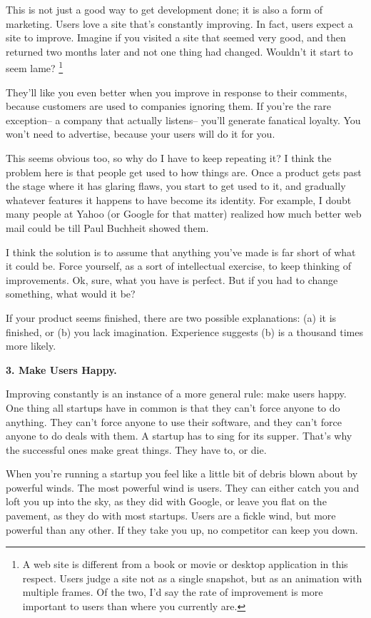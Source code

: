 \documentclass[12pt]{book}
\begin{document}
This is not just a good way to get development done; it is also a form
of marketing. Users love a site that's constantly improving. In fact,
users expect a site to improve. Imagine if you visited a site that
seemed very good, and then returned two months later and not one thing
had changed. Wouldn't it start to seem lame? \footnote{A web site is different from a book or movie or desktop
application in this respect. Users judge a site not as a single
snapshot, but as an animation with multiple frames. Of the two, I'd say
the rate of improvement is more important to users than where you
currently are.}

They'll like you even better when you improve in response to their
comments, because customers are used to companies ignoring them. If
you're the rare exception-- a company that actually listens-- you'll
generate fanatical loyalty. You won't need to advertise, because your
users will do it for you.

This seems obvious too, so why do I have to keep repeating it? I think
the problem here is that people get used to how things are. Once a
product gets past the stage where it has glaring flaws, you start to get
used to it, and gradually whatever features it happens to have become
its identity. For example, I doubt many people at Yahoo (or Google for
that matter) realized how much better web mail could be till Paul
Buchheit showed them.

I think the solution is to assume that anything you've made is far short
of what it could be. Force yourself, as a sort of intellectual exercise,
to keep thinking of improvements. Ok, sure, what you have is perfect.
But if you had to change something, what would it be?

If your product seems finished, there are two possible explanations: (a)
it is finished, or (b) you lack imagination. Experience suggests (b) is
a thousand times more likely.

\textbf{3. Make Users Happy.}

Improving constantly is an instance of a more general rule: make users
happy. One thing all startups have in common is that they can't force
anyone to do anything. They can't force anyone to use their software,
and they can't force anyone to do deals with them. A startup has to sing
for its supper. That's why the successful ones make great things. They
have to, or die.

When you're running a startup you feel like a little bit of debris blown
about by powerful winds. The most powerful wind is users. They can
either catch you and loft you up into the sky, as they did with Google,
or leave you flat on the pavement, as they do with most startups. Users
are a fickle wind, but more powerful than any other. If they take you
up, no competitor can keep you down.
\end{document}
